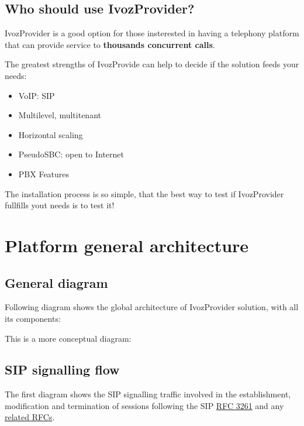 \documentclass[letterpaper,10pt,english]{sphinxmanual}
\begin{document}
\section{Who should use IvozProvider?}
\label{intro/use_cases::doc}\label{intro/use_cases:who-should-use-ivozprovider}
IvozProvider is a good option for those insterested in having a telephony
platform that can provide service to \textbf{thousands concurrent calls}.

The greatest strengths of IvozProvide can help to decide if the solution
feeds your needs:
\begin{itemize}
\item {} 
VoIP: SIP

\item {} 
Multilevel, multitenant

\item {} 
Horizontal scaling

\item {} 
PseudoSBC: open to Internet

\item {} 
PBX Features

\end{itemize}

The installation process is so simple, that the best way to test if
IvozProvider fullfills yout needs is to test it!


\chapter{Platform general architecture}
\label{architecture/index:platform-general-architecture}\label{architecture/index::doc}\label{architecture/index:architecture}

\section{General diagram}
\label{architecture/index:general-diagram}
Following diagram shows the global architecture of IvozProvider solution,
with all its components:

\noindent{}

This is a more conceptual diagram:

\noindent{}


\section{SIP signalling flow}
\label{architecture/index:sip-signalling-flow}\label{architecture/index:signallingflow}
The first diagram shows the SIP signalling traffic involved in the
establishment, modification and termination of sessions following the SIP
\href{https://tools.ietf.org/html/rfc3261}{RFC 3261} and any \href{https://www.packetizer.com/ipmc/sip/standards.html}{related RFCs}.
\end{document}
